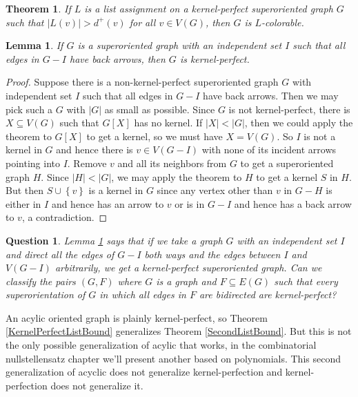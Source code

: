 \documentclass[openany]{tufte-book} %
\theoremstyle{plain}
\newtheorem{lemma}{Lemma}
\newtheorem{question}{Question}
\newtheorem{theorem}{Theorem}
\newcommand{\set}[1]{\left\{ #1 \right\}}
\newcommand{\card}[1]{\left|#1\right|}
\begin{document}
\begin{theorem}\label{KernelPerfectSuperListBound}
If $L$ is a list assignment on a kernel-perfect superoriented graph $G$ such that $\card{L(v)} > d^+(v)$ for all $v \in V(G)$, then $G$ is $L$-colorable.
\end{theorem}

\begin{lemma}\label{KostochkaYanceyKernelLemma}
If $G$ is a superoriented graph with an independent set $I$ such that all edges in $G-I$ have back arrows, then $G$ is kernel-perfect.
\end{lemma}
\begin{proof}
Suppose there is a non-kernel-perfect superoriented graph $G$ with independent set $I$ such that all edges in $G-I$ have back arrows.  Then we may pick such a $G$ with $\card{G}$
as small as possible.  Since $G$ is not kernel-perfect, there is $X \subseteq V(G)$ such that $G[X]$ has no kernel.  If $\card{X} < \card{G}$, 
then we could apply the theorem to $G[X]$ to get a kernel, so we must have $X = V(G)$.  So $I$ is not a kernel in $G$ and hence there is $v \in V(G-I)$ 
with none of its incident arrows pointing into $I$.  Remove $v$ and all its neighbors from $G$ to get a superoriented graph $H$. Since $\card{H} < \card{G}$, we may apply the
theorem to $H$ to get a kernel $S$ in $H$.  But then $S \cup \set{v}$ is a kernel in $G$ since any vertex other than $v$ in $G-H$ is either in $I$ and hence 
has an arrow to $v$ or is in $G-I$ and hence has a back arrow to $v$, a contradiction.
\end{proof}

\begin{question}
Lemma \ref{KostochkaYanceyKernelLemma} says that if we take a graph $G$ with an independent set $I$ and direct all the edges of $G-I$ both ways and the edges 
between $I$ and $V(G-I)$ arbitrarily, we get a kernel-perfect superoriented graph.  Can we classify the pairs $(G, F)$ where $G$ is a graph and $F \subseteq E(G)$ such that
every superorientation of $G$ in which all edges in $F$ are bidirected are kernel-perfect? 
\end{question}

An acylic oriented graph is plainly kernel-perfect, so Theorem \ref{KernelPerfectListBound} generalizes Theorem \ref{SecondListBound}.  
But this is not the only possible generalization of acylic that works, in the combinatorial nullstellensatz chapter we'll present 
another based on polynomials.
This second generalization of acyclic does not generalize kernel-perfection and kernel-perfection does not generalize it.
\end{document}
